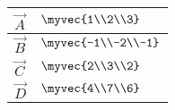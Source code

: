 \begin{table}[H]
\centering
\renewcommand{\arraystretch}{1}
\begin{tabular}{|m{2cm}|m{2cm}|}
\hline
  $\vec{A}$   &  $\myvec{1\\2\\3}$ \\ \hline 
  $\vec{B}$   &  $\myvec{-1\\-2\\-1}$ \\ \hline
  $\vec{C}$   &  $\myvec{2\\3\\2}$ \\ \hline
  $\vec{D}$   &  $\myvec{4\\7\\6}$ \\ \hline
\end{tabular}
\end{table}